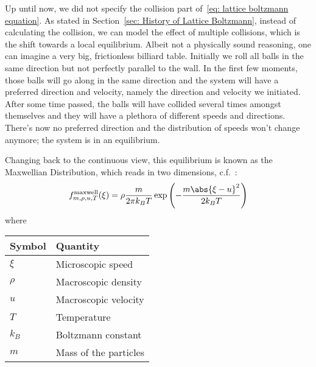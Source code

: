 Up until now, we did not specify the collision part of~\eqref{eq: lattice boltzmann equation}.
As stated in Section~\ref{sec: History of Lattice Boltzmann}, instead of calculating the collision, we can model the effect of multiple collisions, which is the shift towards a local equilibrium.
Albeit not a physically sound reasoning, one can imagine a very big, frictionless billiard table.
Initially we roll all balls in the same direction but not perfectly parallel to the wall.
In the first few moments, those balls will go along in the same direction and the system will have a preferred direction and velocity, namely the direction and velocity we initiated.
After some time passed, the balls will have collided several times amongst themselves and they will have a plethora of different speeds and directions.
There's now no preferred direction and the distribution of speeds won't change anymore; the system is in an equilibrium.

Changing back to the continuous view, this equilibrium is known as the Maxwellian Distribution, which reads in two dimensions, c.f.~\cite{succi2001lattice}:
\begin{equation}
  \label{eq:maxwell distribution raw}
  f_{m, \rho, u, T}^{\text{maxwell}}(\xi) = \rho \frac{m}{2\pi k_B T} \exp \left( - \frac{m\abs{\xi-u}^2}{2 k_B T}\right)
\end{equation}
where
\begin{center}
  \begin{tabular}{@{}ll@{}}
    \toprule
    Symbol & Quantity  \\
    \midrule
    $\xi$  & Microscopic speed  \\
    $\rho$ & Macroscopic density     \\
    $u$    & Macroscopic velocity   \\
    $T$    & Temperature   \\
    $k_B$  & Boltzmann constant \\
    $m$    & Mass of the particles   \\
    \bottomrule
  \end{tabular}
\end{center}

